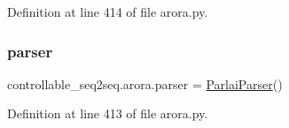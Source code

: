 Definition at line 414 of file arora.\+py.

\mbox{\label{namespacecontrollable__seq2seq_1_1arora_a0940ac1dead7a4c7c7ad297f73305bc6}} 
\subsubsection{\texorpdfstring{parser}{parser}}
{\footnotesize\ttfamily controllable\+\_\+seq2seq.\+arora.\+parser = \hyperlink{classparlai_1_1core_1_1params_1_1ParlaiParser}{Parlai\+Parser}()}



Definition at line 413 of file arora.\+py.

